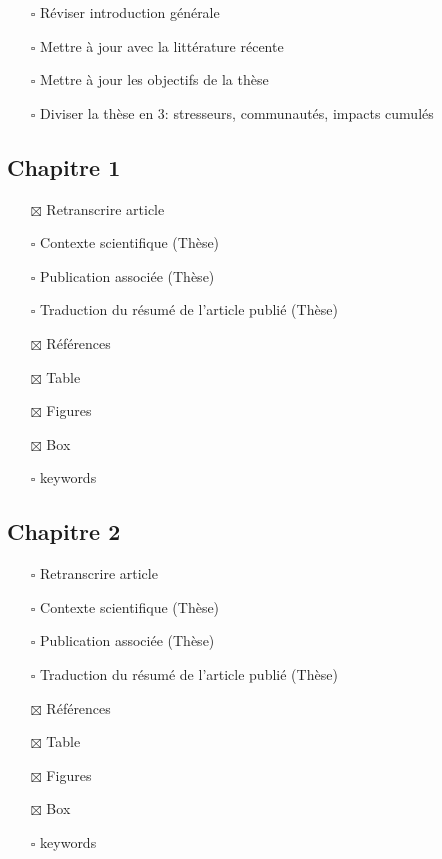 \begin{itemize}
\tightlist
\item[$\square$]
  Réviser introduction générale
\item[$\square$]
  Mettre à jour avec la littérature récente
\item[$\square$]
  Mettre à jour les objectifs de la thèse
\item[$\square$]
  Diviser la thèse en 3: stresseurs, communautés, impacts cumulés
\end{itemize}

\hypertarget{chapitre-1}{%
\subsection*{Chapitre 1}\label{chapitre-1}}

\begin{itemize}
\tightlist
\item[$\boxtimes$]
  Retranscrire article
\item[$\square$]
  Contexte scientifique (Thèse)
\item[$\square$]
  Publication associée (Thèse)
\item[$\square$]
  Traduction du résumé de l'article publié (Thèse)
\item[$\boxtimes$]
  Références
\item[$\boxtimes$]
  Table
\item[$\boxtimes$]
  Figures
\item[$\boxtimes$]
  Box
\item[$\square$]
  keywords
\end{itemize}

\hypertarget{chapitre-2}{%
\subsection*{Chapitre 2}\label{chapitre-2}}

\begin{itemize}
\tightlist
\item[$\square$]
  Retranscrire article
\item[$\square$]
  Contexte scientifique (Thèse)
\item[$\square$]
  Publication associée (Thèse)
\item[$\square$]
  Traduction du résumé de l'article publié (Thèse)
\item[$\boxtimes$]
  Références
\item[$\boxtimes$]
  Table
\item[$\boxtimes$]
  Figures
\item[$\boxtimes$]
  Box
\item[$\square$]
  keywords
\end{itemize}

